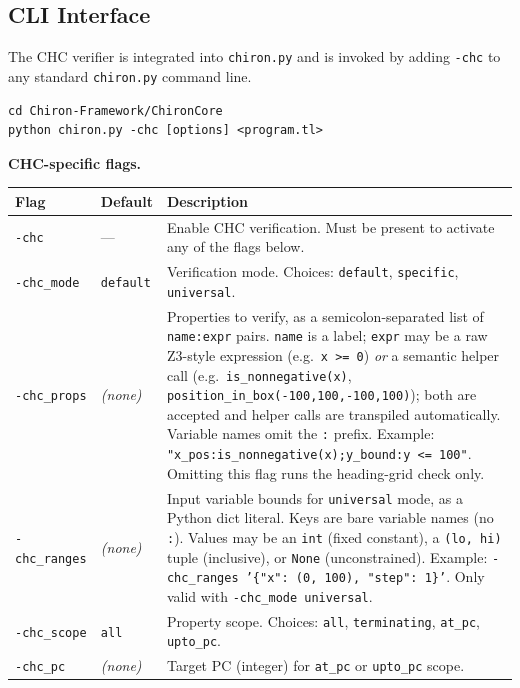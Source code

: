 \subsection*{CLI Interface}

The CHC verifier is integrated into \texttt{chiron.py} and is invoked by adding \texttt{-chc} to any standard \texttt{chiron.py} command line.

\begin{lstlisting}[style=terminal]
cd Chiron-Framework/ChironCore
python chiron.py -chc [options] <program.tl>
\end{lstlisting}

\noindent\textbf{CHC-specific flags.}

\begin{longtable}{p{3.0cm} p{2.2cm} p{10.5cm}}
\toprule
\textbf{Flag} & \textbf{Default} & \textbf{Description} \\
\midrule
\endhead
\texttt{-chc} & --- & Enable CHC verification. Must be present to activate any of the flags below. \\
\addlinespace
\texttt{-chc\_mode} & \texttt{default} & Verification mode. Choices: \texttt{default}, \texttt{specific}, \texttt{universal}. \\
\addlinespace
\texttt{-chc\_props} & \textit{(none)} & Properties to verify, as a semicolon-separated list of \texttt{name:expr} pairs. \texttt{name} is a label; \texttt{expr} may be a raw Z3-style expression (e.g.\ \texttt{x >= 0}) \emph{or} a semantic helper call (e.g.\ \texttt{is\_nonnegative(x)}, \texttt{position\_in\_box(-100,100,-100,100)}); both are accepted and helper calls are transpiled automatically. Variable names omit the \texttt{:} prefix. Example: \mbox{\texttt{"x\_pos:is\_nonnegative(x);y\_bound:y <= 100"}}. Omitting this flag runs the heading-grid check only. \\
\addlinespace
\texttt{-chc\_ranges} & \textit{(none)} & Input variable bounds for \texttt{universal} mode, as a Python dict literal. Keys are bare variable names (no \texttt{:}). Values may be an \texttt{int} (fixed constant), a \texttt{(lo, hi)} tuple (inclusive), or \texttt{None} (unconstrained). Example: \mbox{\texttt{-chc\_ranges '\{"x": (0, 100), "step": 1\}'}}. Only valid with \texttt{-chc\_mode universal}. \\
\addlinespace
\texttt{-chc\_scope} & \texttt{all} & Property scope. Choices: \texttt{all}, \texttt{terminating}, \texttt{at\_pc}, \texttt{upto\_pc}. \\
\addlinespace
\texttt{-chc\_pc} & \textit{(none)} & Target PC (integer) for \texttt{at\_pc} or \texttt{upto\_pc} scope. \\

\end{longtable}
